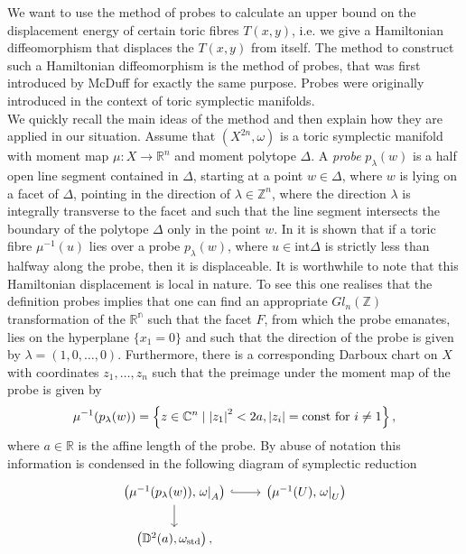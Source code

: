 \documentclass[12pt,a4paper,draft]{scrartcl}
\begin{document}
We want to use the method of probes to calculate an upper bound on the displacement energy of certain toric fibres $T(x,y)$, i.e. we give a Hamiltonian diffeomorphism that displaces the $T(x,y)$ from itself. The method to construct such a Hamiltonian diffeomorphism is the method of probes, that was first introduced by McDuff \cite{mcduff2011displacing} for exactly the same purpose. Probes were originally introduced in the context of toric symplectic manifolds.\\
We quickly recall the main ideas of the method and then explain how they are applied in our situation. Assume that $(X^{2n},\omega)$ is a toric symplectic manifold with moment map $\mu:X\to ℝ^n$ and moment polytope $\Delta$. A \textit{probe} $p_\lambda(w)$ is a half open line segment contained in $\Delta$, starting at a point $w \in \Delta$, where $w$ is lying on a facet of $\Delta$, pointing in the direction of $\lambda \in ℤ^n$, where the direction  $\lambda$ is integrally transverse to the facet and such that the line segment intersects the boundary of the polytope $\Delta$ only in the point $w$. In \cite[Lemma 2.4.]{mcduff2011displacing} it is shown that if a toric fibre $\mu^{-1}(u)$ lies over a probe $p_\lambda(w)$, where $u\in \text{int}\Delta$ is strictly less than halfway along the probe, then it is displaceable. It is worthwhile to note that this Hamiltonian displacement is local in nature. To see this one realises that the definition probes implies that one can find an appropriate $Gl_n(\mathbb{Z})$ transformation of the $\mathbb{R^n}$ such that the facet $F$, from which the probe emanates, lies on the hyperplane $\{x_1=0\}$ and such that the direction of the probe is given by $\lambda=(1,0,\ldots,0)$. Furthermore, there is a corresponding Darboux chart on $X$ with coordinates $z_1,\ldots,z_n$ such that the preimage under the moment map of the probe is given by
\begin{equation*}
    \mu^{-1}(p_\lambda(w))=\left\{z\in \mathbb{C}^n \mid \abs{z_1}^2<2a, \abs{z_i}=\text{const for }i\neq 1\right\},
\end{equation*}
where $a \in \mathbb{R}$ is the affine length of the probe. By abuse of notation this information is condensed in the following diagram of symplectic reduction
\[
\begin{tikzcd}
  \left(\mu^{-1}(p_\lambda(w)),\left.\omega\right|_A\right)\ar[r,hook]\ar[d]&
  \left(\mu^{-1}(U),\left.\omega\right|_U\right)
  \\
  \left(\mathbb{D}^2(a),\omega_\text{std}\right),
\end{tikzcd}
\]
\end{document}

